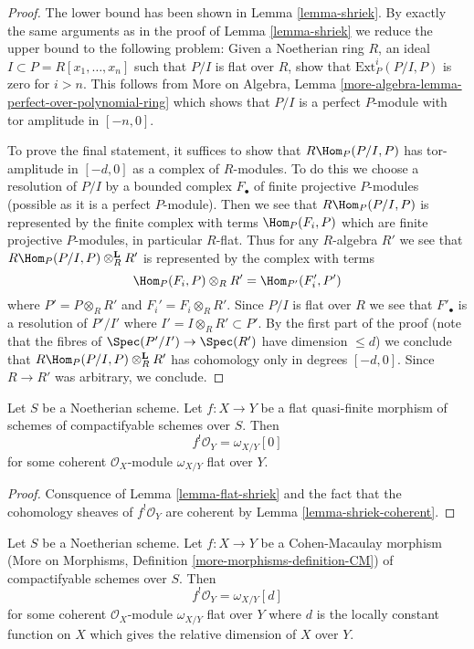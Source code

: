 \begin{proof}
The lower bound has been shown in Lemma \ref{lemma-shriek}.
By exactly the same arguments as in the proof of
Lemma \ref{lemma-shriek} we reduce the upper bound to the
following problem: Given a Noetherian ring $R$, an
ideal $I \subset P = R[x_1, \ldots, x_n]$ such that $P/I$
is flat over $R$, show that $\text{Ext}^i_P(P/I, P)$ is
zero for $i > n$. This follows from
More on Algebra, Lemma \ref{more-algebra-lemma-perfect-over-polynomial-ring}
which shows that $P/I$ is a perfect $P$-module with
tor amplitude in $[-n, 0]$.

\medskip\noindent
To prove the final statement, it suffices to show that
$R\Hom_P(P/I, P)$ has tor-amplitude in $[-d, 0]$ as a complex
of $R$-modules. To do this we choose a resolution of $P/I$ by
a bounded complex $F_\bullet$ of finite projective $P$-modules (possible as
it is a perfect $P$-module). Then we see that $R\Hom_P(P/I, P)$ is represented
by the finite complex with terms $\Hom_P(F_i, P)$ which are finite
projective $P$-modules, in particular $R$-flat. Thus for any $R$-algebra
$R'$ we see that $R\Hom_P(P/I, P) \otimes_R^\mathbf{L} R'$
is represented by the complex with terms
$$
\Hom_P(F_i, P) \otimes_R R' = \Hom_{P'}(F_i', P')
$$
where $P' = P \otimes_R R'$ and $F_i' = F_i \otimes_R R'$. Since
$P/I$ is flat over $R$ we see that $F'_\bullet$ is a resolution
of $P'/I'$ where $I' = I \otimes_R R' \subset P'$. By the
first part of the proof (note that the fibres of $\Spec(P'/I') \to \Spec(R')$
have dimension $\leq d$) we conclude that
$R\Hom_P(P/I, P) \otimes_R^\mathbf{L} R'$
has cohomology only in degrees $[-d, 0]$. Since $R \to R'$
was arbitrary, we conclude.
\end{proof}

\begin{lemma}
\label{lemma-flat-quasi-finite-shriek}
Let $S$ be a Noetherian scheme. Let $f : X \to Y$ be a flat quasi-finite
morphism of schemes of compactifyable schemes over $S$. Then
$$
f^!\mathcal{O}_Y = \omega_{X/Y}[0]
$$
for some coherent $\mathcal{O}_X$-module $\omega_{X/Y}$ flat over $Y$.
\end{lemma}

\begin{proof}
Consquence of Lemma \ref{lemma-flat-shriek} and the fact that the
cohomology sheaves of $f^!\mathcal{O}_Y$ are coherent by
Lemma \ref{lemma-shriek-coherent}.
\end{proof}

\begin{lemma}
\label{lemma-CM-shriek}
Let $S$ be a Noetherian scheme. Let $f : X \to Y$ be a Cohen-Macaulay
morphism (More on Morphisms, Definition \ref{more-morphisms-definition-CM})
of compactifyable schemes over $S$. Then
$$
f^!\mathcal{O}_Y = \omega_{X/Y}[d]
$$
for some coherent $\mathcal{O}_X$-module $\omega_{X/Y}$ flat over $Y$
where $d$ is the locally constant
function on $X$ which gives the relative dimension of $X$ over $Y$.
\end{lemma}

